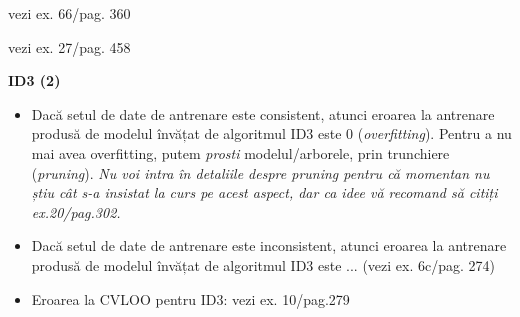 \documentclass[12pt]{article}
\begin{document}
	vezi ex. 66/pag. 360
	
	vezi ex. 27/pag. 458
	
	\textbf{\large{ID3 (2)}}
	\begin{itemize}
		\item Dacă setul de date de antrenare este consistent, atunci eroarea la antrenare produsă de modelul învățat de algoritmul ID3 este 0 (\textit{overfitting}). Pentru a nu mai avea overfitting, putem \textit{prosti} modelul/arborele, prin trunchiere (\textit{pruning}). \textit{Nu voi intra în detaliile despre pruning pentru că momentan nu știu cât s-a insistat la curs pe acest aspect, dar ca idee vă recomand să citiți ex.20/pag.302.}
		\item Dacă setul de date de antrenare este inconsistent, atunci eroarea la antrenare produsă de modelul învățat de algoritmul ID3 este ... (vezi ex. 6c/pag. 274)
		\item Eroarea la CVLOO pentru ID3: vezi ex. 10/pag.279
	\end{itemize}
	
\end{document}
